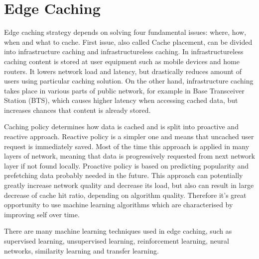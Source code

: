 \documentclass[conference]{IEEEtran}
\begin{document}




\section{Edge Caching}
Edge caching strategy depends on solving four fundamental issues: where, how, when and what to cache\cite{cache3}. First issue, also called Cache placement, can be divided into infrastructure caching and infrastructureless caching. In infrastructureless caching content is stored at user equipment such as mobile devices and home routers. It lowers network load and latency, but drastically reduces amount of users using particular caching solution. On the other hand, infrastructure caching takes place in various parts of public network, for example in Base Transceiver Station (BTS), which causes higher latency when accessing cached data, but increases chances that content is already stored\cite{cache3}.\par
Caching policy determines how data is cached and is split into proactive and reactive approach. Reactive policy is a simpler one and means that uncached user request is immediately saved. Most of the time this approach is applied in many layers of network, meaning that data is progressively requested from next network layer if not found locally. Proactive policy is based on predicting popularity and prefetching data probably needed in the future. This approach can potentially greatly increase network quality and decrease its load, but also can result in large decrease of cache hit ratio, depending on algorithm quality. Therefore it's great opportunity to use machine learning algorithms which are characterised by improving self over time\cite{cache3}.\par
There are many machine learning techniques used in edge caching, such as supervised learning, unsupervised learning, reinforcement learning, neural networks, similarity learning and transfer learning\cite{cache4}.\par
\end{document}

